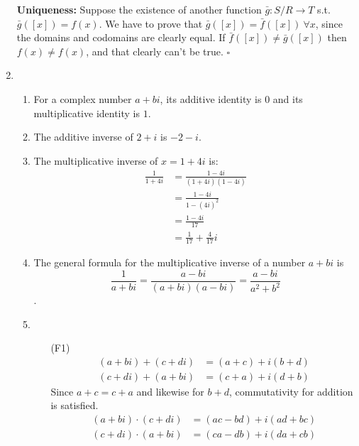 \documentclass[12pt]{article}
\begin{document}
\begin{enumerate}
          \textbf{Uniqueness:} Suppose the existence of another function $\bar{g}: S/R\rightarrow T$ s.t. $\bar{g}([x])=f(x)$.
          We have to prove that $\bar{g}([x])=\bar{f}([x])\ \forall x$, since the domains and codomains are clearly equal.
          If $\bar{f}([x])\ne\bar{g}([x])$ then $f(x) \ne f(x)$, and that clearly can't be true. $\square$

    \item \begin{enumerate}
              \item For a complex number $a+bi$, its additive identity is $0$ and its multiplicative identity is $1$.
              \item The additive inverse of $2+i$ is $\boxed{-2-i}$.
              \item The multiplicative inverse of $x=1+4i$ is:
                    \begin{align*}
                        \frac{1}{1+4i} & = \frac{1-4i}{(1+4i)(1-4i)}          \\
                                       & = \frac{1-4i}{1-(4i)^2}              \\
                                       & = \frac{1-4i}{17}                    \\
                                       & = \boxed{\frac{1}{17}+\frac{4}{17}i}
                    \end{align*}
              \item The general formula for the multiplicative inverse of a number $a+bi$ is
                    \[\frac{1}{a+bi}=\frac{a-bi}{(a+bi)(a-bi)}=\frac{a-bi}{a^2+b^2}\].
              \item \begin{itemize}
                        \item[(F1)] \begin{align*}
                                (a+bi)
                                +(c+di)       & =(a+c)+i(b+d) \\
                                (c+di)+(a+bi) & =(c+a)+i(d+b)
                            \end{align*}
                            Since $a+c=c+a$ and likewise for $b+d$, commutativity for addition is satisfied.
                            \begin{align*}
                                (a+bi)
                                \cdot (c+di)        & =(ac-bd)+i(ad+bc) \\
                                (c+di) \cdot (a+bi) & =(ca-db)+i(da+cb)

\end{align*}
\end{itemize}
\end{enumerate}
\end{enumerate}
\end{document}
